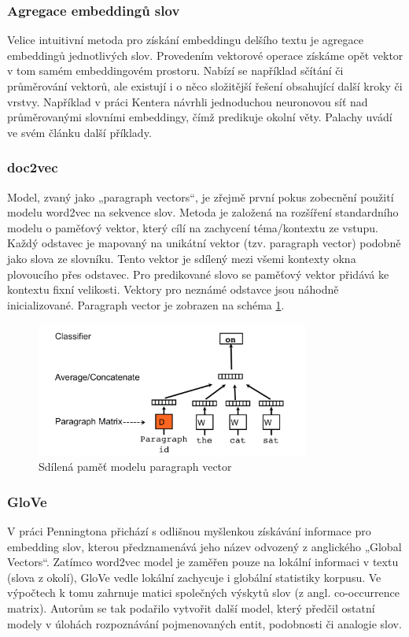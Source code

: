 \documentclass[thesis=M,czech]{FITthesis}[2019/12/23]
\begin{document}
\subsubsection{Agregace embeddingů slov}
Velice intuitivní metoda pro získání embeddingu delšího textu je agregace embeddingů jednotlivých slov. Provedením vektorové operace získáme opět vektor v tom samém embeddingovém prostoru. Nabízí se například sčítání či průměrování vektorů,  ale existují i o něco složitější řešení obsahující další kroky či vrstvy. Například v práci Kentera\cite{kenter2016} návrhli jednoduchou neuronovou síť nad průměrovanými slovními embeddingy, čímž predikuje okolní věty. Palachy uvádí ve svém článku\cite{palachy2019} další příklady.

\subsubsection{doc2vec}
Model, zvaný jako „paragraph vectors“\cite{le2014}, je zřejmě první pokus zobecnění použití modelu word2vec na sekvence slov. Metoda je založená na rozšíření standardního modelu o paměťový vektor, který cílí na zachycení téma/kontextu ze vstupu. Každý odstavec je mapovaný na unikátní vektor (tzv. paragraph vector) podobně jako slova ze slovníku. Tento vektor je sdílený mezi všemi kontexty okna plovoucího přes odstavec. Pro predikované slovo se paměťový vektor přidává ke kontextu fixní velikosti. Vektory pro neznámé odstavce jsou náhodně inicializované. Paragraph vector je zobrazen na schéma \ref{fig:palachy2019PV}.
\begin{figure}\centering
	\includegraphics[width=0.8\textwidth]{images/palachy2019/palachy2019_PV.png}
	\caption{Sdílená paměť modelu paragraph vector\cite{palachy2019}}\label{fig:palachy2019PV}
\end{figure}

\subsubsection{GloVe}
V práci Penningtona\cite{pennington2014} přichází s odlišnou myšlenkou získávání informace pro embedding slov, kterou předznamenává jeho název odvozený z anglického „Global Vectors“. Zatímco word2vec model je zaměřen pouze na lokální informaci v textu (slova z okolí), GloVe vedle lokální zachycuje i globální statistiky korpusu. Ve výpočtech k tomu zahrnuje matici společných výskytů slov (z angl. co-occurrence matrix). Autorům se tak podařilo vytvořit další model, který předčil ostatní modely v úlohách rozpoznávání pojmenovaných entit, podobnosti či analogie slov.
\end{document}
